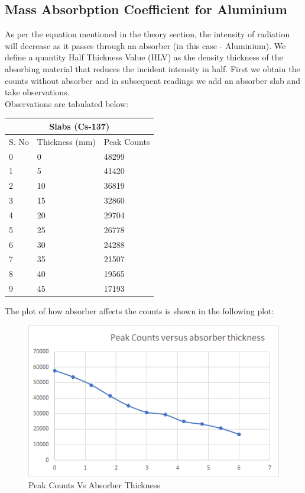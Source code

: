\documentclass[%
 reprint,
nofootinbib,
 amsmath,amssymb,
 aps,
floatfix,
]{revtex4-2}
\begin{document}
\subsection{Mass Absorbption Coefficient for Aluminium}
As per the equation mentioned in the theory section, the intensity of radiation will decrease as it passes through an absorber (in this case - Aluminium). We define a quantity Half Thickness Value (HLV) as the density thickness of the absorbing material that reduces the incident intensity in half. First we obtain the counts without absorber and in subsequent readings we add an absorber slab and take observations.\\
Observations are tabulated below:
\begin{longtable}[c]{|lll|}
\hline
\multicolumn{3}{|c|}{\textbf{Slabs   (Cs-137)}} \\ \hline
\endfirsthead
%
\endhead
%
\multicolumn{1}{|l|}{S. No} & \multicolumn{1}{l|}{Thickness (mm)} & Peak Counts \\ \hline
\multicolumn{1}{|l|}{0} & \multicolumn{1}{l|}{0} & 48299 \\ \hline
\multicolumn{1}{|l|}{1} & \multicolumn{1}{l|}{5} & 41420 \\ \hline
\multicolumn{1}{|l|}{2} & \multicolumn{1}{l|}{10} & 36819 \\ \hline
\multicolumn{1}{|l|}{3} & \multicolumn{1}{l|}{15} & 32860 \\ \hline
\multicolumn{1}{|l|}{4} & \multicolumn{1}{l|}{20} & 29704 \\ \hline
\multicolumn{1}{|l|}{5} & \multicolumn{1}{l|}{25} & 26778 \\ \hline
\multicolumn{1}{|l|}{6} & \multicolumn{1}{l|}{30} & 24288 \\ \hline
\multicolumn{1}{|l|}{7} & \multicolumn{1}{l|}{35} & 21507 \\ \hline
\multicolumn{1}{|l|}{8} & \multicolumn{1}{l|}{40} & 19565 \\ \hline
\multicolumn{1}{|l|}{9} & \multicolumn{1}{l|}{45} & 17193 \\ \hline
\end{longtable}
The plot of how absorber affects the counts is shown in the following plot:
\begin{figure}[H]
    \centering
    \includegraphics[width = 8 cm]{Figures/absorber.png}
    \caption{Peak Counts Vs Absorber Thickness}
    \label{fig:my_label}
\end{figure}
\end{document}
